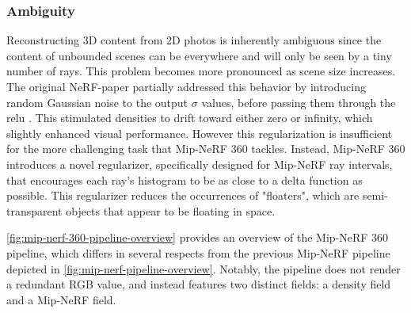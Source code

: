 

\subsubsection{Ambiguity}
Reconstructing 3D content from 2D photos is inherently ambiguous since the content of unbounded scenes can be everywhere and will only be seen by a tiny number of rays. This problem becomes more pronounced as scene size increases. The original NeRF-paper partially addressed this behavior by introducing random Gaussian noise to the output $\sigma$ values, before passing them through the \acrfull{relu} \cite{agarap_deep_2019}. This stimulated densities to drift toward either zero or infinity, which slightly enhanced visual performance. However this regularization is insufficient for the more challenging task that Mip-NeRF 360 tackles. Instead, Mip-NeRF 360 introduces a novel regularizer, specifically designed for Mip-NeRF ray intervals, that encourages each ray's histogram to be as close to a delta function as possible. This regularizer reduces the occurrences of "floaters", which are semi-transparent objects that appear to be floating in space.



\autoref{fig:mip-nerf-360-pipeline-overview} provides an overview of the Mip-NeRF 360 pipeline, which differs in several respects from the previous Mip-NeRF pipeline depicted in \autoref{fig:mip-nerf-pipeline-overview}. Notably, the pipeline does not render a redundant RGB value, and instead features two distinct fields: a density field and a Mip-NeRF field.


